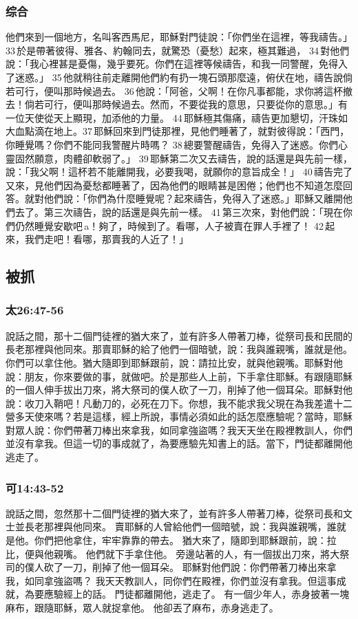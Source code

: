 \subsubsection{综合}
他們來到一個地方，名叫客西馬尼，耶穌對門徒說：「你們坐在這裡，等我禱告。」33 於是帶著彼得、雅各、約翰同去，就驚恐（憂愁）起來，極其難過， 34 對他們說：「我心裡甚是憂傷，幾乎要死。你們在這裡等候禱告，和我一同警醒，免得入了迷惑。」 35 他就稍往前走離開他們約有扔一塊石頭那麼遠，俯伏在地，禱告說倘若可行，便叫那時候過去。 36 他說：「阿爸，父啊！在你凡事都能，求你將這杯撤去！倘若可行，便叫那時候過去。然而，不要從我的意思，只要從你的意思。」有一位天使從天上顯現，加添他的力量。 44 耶穌極其傷痛，禱告更加懇切，汗珠如大血點滴在地上。37 耶穌回來到門徒那裡，見他們睡著了，就對彼得說：「西門，你睡覺嗎？你們不能同我警醒片時嗎？ 38 總要警醒禱告，免得入了迷惑。你們心靈固然願意，肉體卻軟弱了。」 39 耶穌第二次又去禱告，說的話還是與先前一樣，說：「我父啊！這杯若不能離開我，必要我喝，就願你的意旨成全！」 40 禱告完了又來，見他們因為憂愁都睡著了，因為他們的眼睛甚是困倦；他們也不知道怎麼回答。就對他們說：「你們為什麼睡覺呢？起來禱告，免得入了迷惑。」耶穌又離開他們去了。第三次禱告，說的話還是與先前一樣。 41 第三次來，對他們說：「現在你們仍然睡覺安歇吧 a！夠了，時候到了。看哪，人子被賣在罪人手裡了！ 42 起來，我們走吧！看哪，那賣我的人近了！」

\subsection{被抓}%
\subsubsection{太26:47-56}
說話之間，那十二個門徒裡的猶大來了，並有許多人帶著刀棒，從祭司長和民間的長老那裡與他同來。那賣耶穌的給了他們一個暗號，說：我與誰親嘴，誰就是他。你們可以拿住他。猶大隨即到耶穌跟前，說：請拉比安，就與他親嘴。耶穌對他說：朋友，你來要做的事，就做吧。於是那些人上前，下手拿住耶穌。有跟隨耶穌的一個人伸手拔出刀來，將大祭司的僕人砍了一刀，削掉了他一個耳朵。耶穌對他說：收刀入鞘吧！凡動刀的，必死在刀下。你想，我不能求我父現在為我差遣十二營多天使來嗎？若是這樣，經上所說，事情必須如此的話怎麼應驗呢？當時，耶穌對眾人說：你們帶著刀棒出來拿我，如同拿強盜嗎？我天天坐在殿裡教訓人，你們並沒有拿我。但這一切的事成就了，為要應驗先知書上的話。當下，門徒都離開他逃走了。

\subsubsection{可14:43-52}
說話之間，忽然那十二個門徒裡的猶大來了，並有許多人帶著刀棒，從祭司長和文士並長老那裡與他同來。
賣耶穌的人曾給他們一個暗號，說：我與誰親嘴，誰就是他。你們把他拿住，牢牢靠靠的帶去。
猶大來了，隨即到耶穌跟前，說：拉比，便與他親嘴。
他們就下手拿住他。
旁邊站著的人，有一個拔出刀來，將大祭司的僕人砍了一刀，削掉了他一個耳朵。
耶穌對他們說：你們帶著刀棒出來拿我，如同拿強盜嗎？
我天天教訓人，同你們在殿裡，你們並沒有拿我。但這事成就，為要應驗經上的話。
門徒都離開他，逃走了。
有一個少年人，赤身披著一塊麻布，跟隨耶穌，眾人就捉拿他。
他卻丟了麻布，赤身逃走了。


